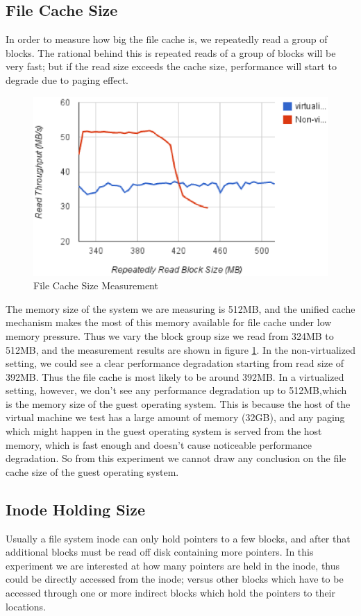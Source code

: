 \subsection{File Cache Size}
In order to measure how big the file cache is, we repeatedly read a group of blocks. The rational behind this is repeated reads of a group of blocks will be very fast; but if the read size exceeds the cache size, performance will start to degrade due to paging effect.

\begin{figure}
\centering
\includegraphics[width=.65\textwidth]{figures/cache_size.eps}
\caption{File Cache Size Measurement}
\label{fig:cache_size}
\end{figure}

The memory size of the system we are measuring is 512MB, and the unified cache mechanism makes the most of this memory available for file cache under low memory pressure. Thus we vary the block group size we read from 324MB to 512MB, and the measurement results are shown in figure \ref{fig:cache_size}. In the non-virtualized setting, we could see a clear performance degradation starting from read size of 392MB. Thus the file cache is most likely to be around 392MB. In a virtualized setting, however, we don't see any performance degradation up to 512MB,which is the memory size of the guest operating system. This is because the host of the virtual machine we test has a large amount of memory (32GB), and any paging which might happen in the guest operating system is served from the host memory, which is fast enough and doesn't cause noticeable performance degradation. So from this experiment we cannot draw any conclusion on the file cache size of the guest operating system.


\subsection{Inode Holding Size}
Usually a file system inode can only hold pointers to a few blocks, and after that additional blocks must be read off disk containing more pointers. In this experiment we are interested at how many pointers are held in the inode, thus could be directly accessed from the inode; versus other blocks which have to be accessed through one or more indirect blocks which hold the pointers to their locations.

